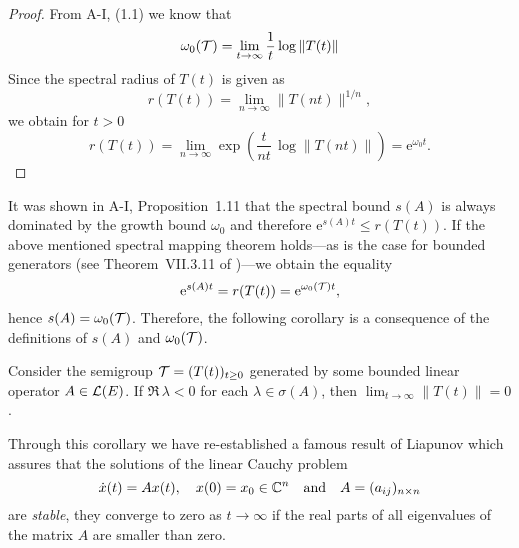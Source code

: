 \begin{proof}
From A-I, (1.1) we know that
\[
    \omega_{0}(\mathcal{T}) = \lim_{t \to \infty} \frac{1}{t} \log \|T(t)\|
\]
Since the spectral radius of $T(t)$ is given as
\[
    r(T(t)) = \lim_{n \to \infty} \|T(nt)\|^{1/n} ,
\]
we obtain for $t > 0$
\[
    r(T(t)) = \lim_{n \to \infty} \exp\left( \frac{t}{nt}\,\log \|T(nt)\|\right) = \mathrm{e}^{\omega_{0} t} .
\]
\end{proof}
It was shown in A-I, Proposition~1.11 that the spectral bound $s(A)$ is always dominated by the growth bound $\omega_{0}$ and therefore $\mathrm{e}^{s(A)t} \leq r(T(t))$.
If the above mentioned spectral mapping theorem holds---as is the case for bounded generators (\eg see Theorem~VII.3.11 of \citet{dunfordschwartz:1958})---we obtain the equality
\[
    \mathrm{e}^{s(A)t} = r(T(t)) = \mathrm{e}^{\omega_{0}(\mathcal{T}) t} ,
\]
hence $s(A) = \omega_{0}(\mathcal{T})$.
Therefore, the following corollary is a consequence of the definitions of $s(A)$ and $\omega_{0}(\mathcal{T})$.
\begin{corollary}\label{cor:a3-1.2}
Consider the semigroup $\mathcal{T} = (T(t))_{t \geq 0}$ generated by some bounded linear operator $A \in \mathcal{L}(E)$.
If $\Re\,\lambda < 0$ for each $\lambda \in \sigma(A)$, then $\lim_{t \to \infty}\|T(t)\| = 0$.
\end{corollary}
Through this corollary we have re-established a famous result of Liapunov which assures that the solutions of the linear Cauchy problem
\[
    \dot{x}(t) = Ax(t), \quad x(0) = x_{0} \in \mathbb{C}^{n} \quad \text{and} \quad A = (a_{ij})_{n\times n}
\]
are \emph{stable}, \ie they converge to zero as $t \to \infty$ if the real parts of all eigenvalues of the matrix $A$ are smaller than zero.

